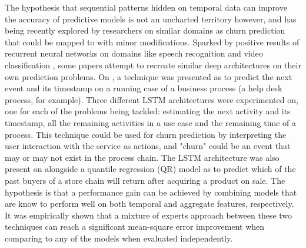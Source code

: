 \documentclass{kththesis}
\begin{document}
The hypothesis that sequential patterns hidden on temporal data can improve the accuracy of predictive models is not an uncharted territory however, and has being recently explored by researchers on similar domains as churn prediction that could be mapped to with minor modifications. Sparked by positive results of recurrent neural networks on domains like speech recognition \citep{graves2013speech} and video classification \citep{yue2015beyond}, some papers attempt to recreate similar deep architectures on their own prediction problems. On \citep{Tax2016}, a technique was presented as to predict the next event and its timestamp on a running case of a business process (a help desk process, for example). Three different LSTM architectures were experimented on, one for each of the problems being tackled: estimating the next activity and its timestamp, all the remaining activities in a use case and the remaining time of a process. This technique could be used for churn prediction by interpreting the user interaction with the service as actions, and "churn" could be an event that may or may not exist in the process chain. The LSTM architecture was also present on \citep{Auon2015} alongside a quantile regression (QR) model as to predict which of the past buyers of a store chain will return after acquiring a product on sale. The hypothesis is that a performance gain can be achieved by combining models that are know to perform well on both temporal and aggregate features, respectively. It was empirically shown that a mixture of experts approach between these two techniques can reach a significant mean-square error improvement when comparing to any of the models when evaluated independently. 
\end{document}
